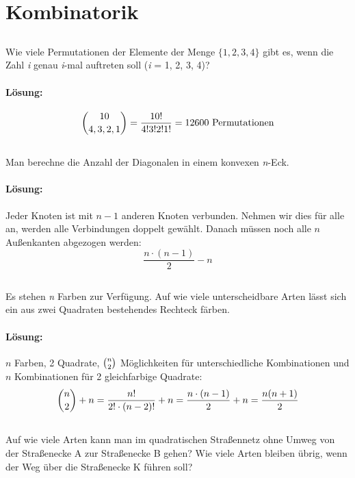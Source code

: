 \documentclass[ngerman]{scrartcl}
\begin{document}
\section{Kombinatorik}

\subsection{}

Wie viele Permutationen der Elemente der Menge $\lbrace 1, 2, 3, 4 \rbrace$ gibt es, wenn die Zahl \textit{i} genau \textit{i}-mal auftreten soll (\textit{i} = 1, 2, 3, 4)?
\paragraph{Lösung:}
\begin{equation*}
\dbinom{10}{4,3,2,1} = \frac{10!}{4!3!2!1!} = 12600\text{ Permutationen}
\end{equation*}
\subsection{}
Man berechne die Anzahl der Diagonalen in einem konvexen \textit{n}-Eck.
\paragraph{Lösung:}
Jeder Knoten ist mit $n-1$ anderen Knoten verbunden. Nehmen wir dies für alle an, werden alle Verbindungen doppelt gewählt. Danach müssen noch alle $n$ Außenkanten abgezogen werden: \[ \frac{n\cdot (n-1)}{2} - n \]
\subsection{}
Es stehen \textit{n} Farben zur Verfügung. Auf wie viele unterscheidbare Arten lässt sich ein aus zwei Quadraten bestehendes Rechteck färben.
\paragraph{Lösung:}
$n$ Farben, 2 Quadrate, $\tbinom{n}{2}$ Möglichkeiten für unterschiedliche Kombinationen und $n$ Kombinationen für 2 gleichfarbige Quadrate:
\begin{equation*}
\dbinom{n}{2} + n =\frac{n!}{2!\cdot (n-2)!} + n = \frac{n\cdot (n-1)}{2} + n = \frac{n(n+1)}{2}
\end{equation*}
\subsection{}
Auf wie viele Arten kann man im quadratischen Straßennetz ohne Umweg von der Straßenecke A zur Straßenecke B gehen? Wie viele Arten bleiben übrig, wenn der Weg über die Straßenecke K führen soll?
\end{document}
